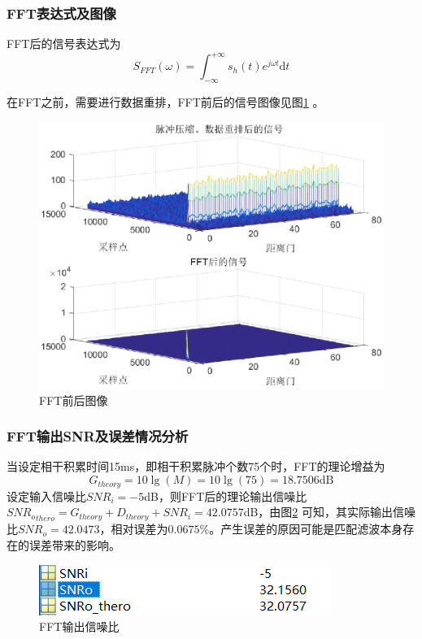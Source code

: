 \documentclass[12pt]{article}
\begin{document}
\subsubsection{FFT表达式及图像}
FFT后的信号表达式为
\begin{equation}\label{FFThou}
  S_{FFT}(\omega)=\int_{-\infty}^{+\infty}s_h(t)e^{j\omega t}\mbox{d}t
\end{equation}\par
在FFT之前，需要进行数据重排，FFT前后的信号图像见图\ref{FFTqianhou}
。\par
\begin{figure}[htbp]
  \centering
  \includegraphics[width=\textwidth]{FFT2}
  \caption{FFT前后图像}\label{FFTqianhou}
\end{figure}
\subsubsection{FFT输出SNR及误差情况分析}
当设定相干积累时间15ms，即相干积累脉冲个数75个时，FFT的理论增益为
\begin{equation}\label{zengyi2}
  G_{theory}=10\lg(M)=10\lg(75)=18.7506\mbox{dB}
\end{equation}
设定输入信噪比$SNR_i=-5$dB，则FFT后的理论输出信噪比${SNR_o}_{thero}=G_{theory}+D_{theory}+SNR_i=42.0757$dB，由图\ref{shuju_FFT}
可知，其实际输出信噪比$SNR_o=42.0473$，相对误差为$0.0675\%$。产生误差的原因可能是匹配滤波本身存在的误差带来的影响。
\begin{figure}[htbp]
  \centering
  \includegraphics[width=.6\textwidth]{TIM20190623132411}
  \caption{FFT输出信噪比}\label{shuju_FFT}
\end{figure}
\end{document}
